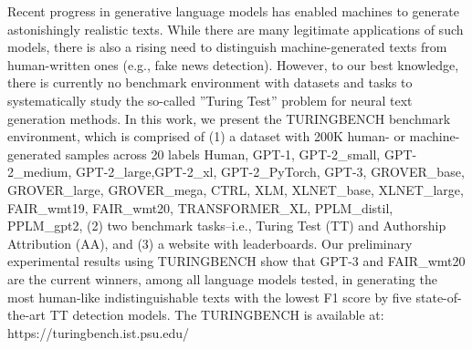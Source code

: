 Recent progress in generative language models has enabled machines to generate astonishingly realistic texts. While there are many legitimate applications of such models, there is also a rising need to distinguish machine-generated texts from human-written ones (e.g., fake news detection). However, to our best knowledge, there is currently no benchmark environment with datasets and tasks to systematically study the so-called ''Turing Test'' problem for neural text generation methods. In this work, we present the TURINGBENCH benchmark environment, which is comprised of (1) a dataset with 200K human- or machine-generated samples across 20 labels {Human, GPT-1, GPT-2\_small, GPT-2\_medium, GPT-2\_large,GPT-2\_xl, GPT-2\_PyTorch, GPT-3, GROVER\_base, GROVER\_large, GROVER\_mega, CTRL, XLM, XLNET\_base, XLNET\_large, FAIR\_wmt19, FAIR\_wmt20, TRANSFORMER\_XL, PPLM\_distil, PPLM\_gpt2}, (2) two benchmark tasks--i.e., Turing Test (TT) and Authorship Attribution (AA), and (3) a website with leaderboards. Our preliminary experimental results using  TURINGBENCH  show that GPT-3 and FAIR\_wmt20 are the current winners, among all language models tested, in generating the most human-like indistinguishable texts with the lowest F1 score by five state-of-the-art TT detection models. The TURINGBENCH  is available at: https://turingbench.ist.psu.edu/
